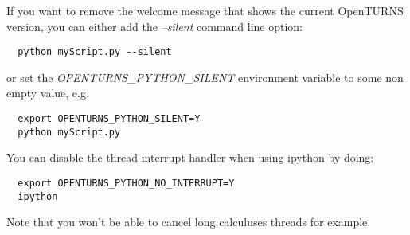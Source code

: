If you want to remove the welcome message that shows the current OpenTURNS version, you can either add the {\itshape --silent} command line option:
\begin{verbatim}
  python myScript.py --silent
\end{verbatim}

or set the {\itshape OPENTURNS\_PYTHON\_SILENT} environment variable to some non empty value, e.g.

\begin{verbatim}
  export OPENTURNS_PYTHON_SILENT=Y
  python myScript.py
\end{verbatim}

You can disable the thread-interrupt handler when using ipython by doing:
\begin{verbatim}
  export OPENTURNS_PYTHON_NO_INTERRUPT=Y
  ipython
\end{verbatim}
Note that you won't be able to cancel long calculuses threads for example.
